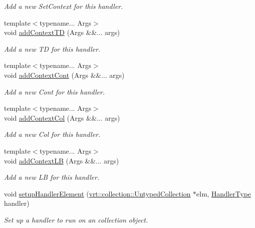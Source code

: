 \begin{DoxyCompactItemize}
\begin{DoxyCompactList}\small\item\em Add a new {\ttfamily Set\+Context} for this handler. \end{DoxyCompactList}\item 
{\footnotesize template$<$typename... Args$>$ }\\void \hyperlink{structvt_1_1runnable_1_1_runnable_new_ac2480a813d1adc735051314093b91e1d}{add\+Context\+TD} (Args \&\&... args)
\begin{DoxyCompactList}\small\item\em Add a new {\ttfamily TD} for this handler. \end{DoxyCompactList}\item 
{\footnotesize template$<$typename... Args$>$ }\\void \hyperlink{structvt_1_1runnable_1_1_runnable_new_a0c551ef0da74a3b29028e390a5e15400}{add\+Context\+Cont} (Args \&\&... args)
\begin{DoxyCompactList}\small\item\em Add a new {\ttfamily Cont} for this handler. \end{DoxyCompactList}\item 
{\footnotesize template$<$typename... Args$>$ }\\void \hyperlink{structvt_1_1runnable_1_1_runnable_new_aa9c078712f8f2321bd247ffbccc8049a}{add\+Context\+Col} (Args \&\&... args)
\begin{DoxyCompactList}\small\item\em Add a new {\ttfamily Col} for this handler. \end{DoxyCompactList}\item 
{\footnotesize template$<$typename... Args$>$ }\\void \hyperlink{structvt_1_1runnable_1_1_runnable_new_a9c4377c29d2c8f1e3b85488038f31bdf}{add\+Context\+LB} (Args \&\&... args)
\begin{DoxyCompactList}\small\item\em Add a new {\ttfamily LB} for this handler. \end{DoxyCompactList}\item 
void \hyperlink{structvt_1_1runnable_1_1_runnable_new_aa494c41e589866c5a7f1669a5c2472b0}{setup\+Handler\+Element} (\hyperlink{structvt_1_1vrt_1_1collection_1_1_untyped_collection}{vrt\+::collection\+::\+Untyped\+Collection} $\ast$elm, \hyperlink{namespacevt_af64846b57dfcaf104da3ef6967917573}{Handler\+Type} handler)
\begin{DoxyCompactList}\small\item\em Set up a handler to run on an collection object. \end{DoxyCompactList}\item 

\end{DoxyCompactItemize}
